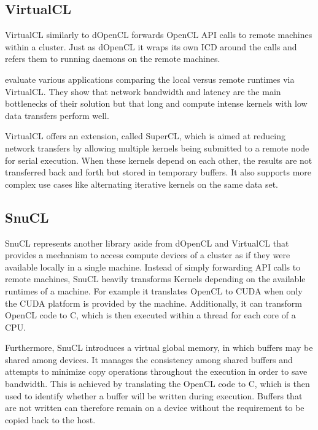 \subsection*{VirtualCL}

VirtualCL similarly to dOpenCL forwards OpenCL API calls to remote machines within a cluster\cite{virtualcl}. Just as dOpenCL it wraps its own ICD around the calls and refers them to running daemons on the remote machines.

\citeauthor{virtualcl} evaluate various applications comparing the local versus remote runtimes via VirtualCL. They show that network bandwidth and latency are the main bottlenecks of their solution but that long and compute intense kernels with low data transfers perform well.

VirtualCL offers an extension, called SuperCL, which is aimed at reducing network transfers by allowing multiple kernels being submitted to a remote node for serial execution. When these kernels depend on each other, the results are not transferred back and forth but stored in temporary buffers. It also supports more complex use cases like alternating iterative kernels on the same data set.

\subsection*{SnuCL}

SnuCL represents another library aside from dOpenCL and VirtualCL that provides a mechanism to access compute devices of a cluster as if they were available locally in a single machine\cite{snucl}. Instead of simply forwarding API calls to remote machines, SnuCL heavily transforms Kernels depending on the available runtimes of a machine. For example it translates OpenCL to CUDA when only the CUDA platform is provided by the machine. Additionally, it can transform OpenCL code to C, which is then executed within a thread for each core of a CPU.

Furthermore, SnuCL introduces a virtual global memory, in which buffers may be shared among devices. It manages the consistency among shared buffers and attempts to minimize copy operations throughout the execution in order to save bandwidth. This is achieved by translating the OpenCL code to C, which is then used to identify whether a buffer will be written during execution. Buffers that are not written can therefore remain on a device without the requirement to be copied back to the host.

